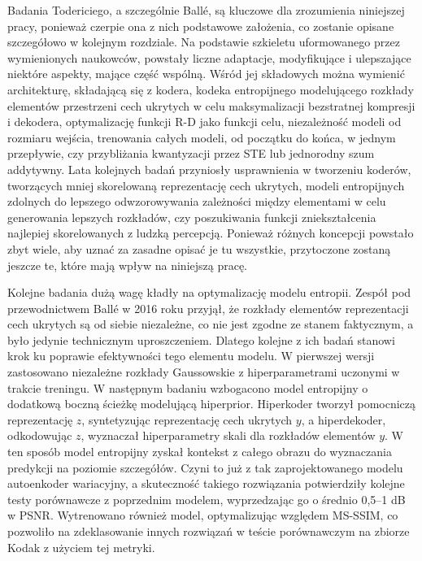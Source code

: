 Badania Todericiego, a szczególnie Ballé, są kluczowe dla zrozumienia niniejszej pracy, ponieważ czerpie ona z nich podstawowe założenia, co zostanie opisane szczegółowo w kolejnym rozdziale. Na podstawie szkieletu uformowanego przez wymienionych naukowców, powstały liczne adaptacje, modyfikujące i ulepszające niektóre aspekty, mające część wspólną. Wśród jej składowych można wymienić architekturę, składającą się z kodera, kodeka entropijnego modelującego rozkłady elementów przestrzeni cech ukrytych w celu maksymalizacji bezstratnej kompresji i dekodera, optymalizację funkcji R-D jako funkcji celu, niezależność modeli od rozmiaru wejścia, trenowania całych modeli, od początku do końca, w jednym przepływie, czy przybliżania kwantyzacji przez STE lub jednorodny szum addytywny. Lata kolejnych badań przyniosły usprawnienia w tworzeniu koderów, tworzących mniej skorelowaną reprezentację cech ukrytych, modeli entropijnych zdolnych do lepszego odwzorowywania zależności między elementami w celu generowania lepszych rozkładów, czy poszukiwania funkcji zniekształcenia najlepiej skorelowanych z ludzką percepcją. Ponieważ różnych koncepcji powstało zbyt wiele, aby uznać za zasadne opisać je tu wszystkie, przytoczone zostaną jeszcze te, które mają wpływ na niniejszą pracę.

Kolejne badania dużą wagę kładły na optymalizację modelu entropii. Zespół pod przewodnictwem Ballé w 2016 roku przyjął, że rozkłady elementów reprezentacji cech ukrytych są od siebie niezależne, co nie jest zgodne ze stanem faktycznym, a było jedynie technicznym uproszczeniem. Dlatego kolejne z ich badań stanowi krok ku poprawie efektywności tego elementu modelu\cite{balle2018variationalimagecompressionscale}. W pierwszej wersji zastosowano niezależne rozkłady Gaussowskie z hiperparametrami uczonymi w trakcie treningu. W następnym badaniu wzbogacono model entropijny o dodatkową boczną ścieżkę modelującą hiperprior. Hiperkoder tworzył pomocniczą reprezentację $z$, syntetyzując reprezentację cech ukrytych $y$, a hiperdekoder, odkodowując $z$, wyznaczał hiperparametry skali dla rozkładów elementów $y$. W ten sposób model entropijny zyskał kontekst z całego obrazu do wyznaczania predykcji na poziomie szczegółów. Czyni to już z tak zaprojektowanego modelu autoenkoder wariacyjny, a skuteczność takiego rozwiązania potwierdziły kolejne testy porównawcze z poprzednim modelem, wyprzedzając go o średnio 0,5--1 dB w PSNR. Wytrenowano również model, optymalizując względem MS-SSIM, co pozwoliło na zdeklasowanie innych rozwiązań w teście porównawczym na zbiorze Kodak z użyciem tej metryki.

